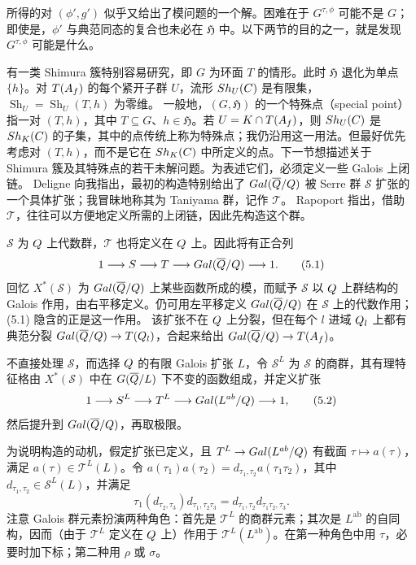 所得的对 $(\phi',g')$ 似乎又给出了模问题的一个解。困难在于 $G^{\tau,\phi}$ 可能不是
$G$；即使是，$\phi'$ 与典范同态的复合也未必在 $\mathfrak H$ 中。以下两节的目的之一，就是发现
$G^{\tau,\phi}$ 可能是什么。

有一类 Shimura 簇特别容易研究，即 $G$ 为环面 $T$ 的情形。此时 $\mathfrak H$ 退化为单点
$\{h\}$。对 $T(A_f)$ 的每个紧开子群 $U$，流形
$Sh_U(C)$ 是有限集，$\operatorname{Sh}_U=\operatorname{Sh}_U(T,h)$ 为零维。
一般地，$(G,\mathfrak H)$ 的一个特殊点（special point）指一对 $(T,h)$，其中
$T\subseteq G$、$h\in\mathfrak H$。若 $U=K\cap T(A_f)$，则
$Sh_U(C)$ 是 $Sh_K(C)$ 的子集，其中的点传统上称为特殊点；我仍沿用这一用法。但最好优先考虑对
$(T,h)$，而不是它在 $Sh_K(C)$ 中所定义的点。下一节想描述关于
Shimura 簇及其特殊点的若干未解问题。为表述它们，必须定义一些 Galois 上闭链。
Deligne 向我指出，最初的构造特别给出了 $Gal(\overline{Q}/Q)$ 被 Serre 群
$\mathcal S$ 扩张的一个具体扩张；我冒昧地称其为 Taniyama 群，记作 $\mathcal T$。
Rapoport 指出，借助 $\mathcal T$，往往可以方便地定义所需的上闭链，因此先构造这个群。

$\mathcal S$ 为 $Q$ 上代数群，$\mathcal T$ 也将定义在 $Q$ 上。因此将有正合列
\begin{equation}
1\longrightarrow S\longrightarrow T
\longrightarrow Gal(\overline{Q}/Q)\longrightarrow1.\tag{5.1}
\end{equation}
回忆 $X^*(\mathcal S)$ 为 $Gal(\overline{Q}/Q)$ 上某些函数所成的模，而赋予
$\mathcal S$ 以 $Q$ 上群结构的 Galois 作用，由右平移定义。仍可用左平移定义
$Gal(\overline{Q}/Q)$ 在 $\mathcal S$ 上的代数作用；(5.1) 隐含的正是这一作用。
该扩张不在 $Q$ 上分裂，但在每个 $l$ 进域 $Q_l$ 上都有典范分裂
$Gal(\overline{Q}/Q)\to T(Q_l)$，合起来给出
$Gal(\overline{Q}/Q)\to T(A_f)$。

不直接处理 $\mathcal S$，而选择 $Q$ 的有限 Galois 扩张 $L$，令
$\mathcal S^L$ 为 $\mathcal S$ 的商群，其有理特征格由
$X^*(\mathcal S)$ 中在 $G(\overline{Q}/L)$ 下不变的函数组成，并定义扩张
\begin{equation}
1\longrightarrow S^L\longrightarrow T^L
\longrightarrow Gal(L^{ab}/Q)\longrightarrow1,\tag{5.2}
\end{equation}
然后提升到 $Gal(\overline{Q}/Q)$，再取极限。

为说明构造的动机，假定扩张已定义，且
$T^L\to Gal(L^{ab}/Q)$ 有截面 $\tau\mapsto a(\tau)$，满足
$a(\tau)\in\mathcal T^L(L)$。令
$a(\tau_1)a(\tau_2)=d_{\tau_1,\tau_2}a(\tau_1\tau_2)$，其中
$d_{\tau_1,\tau_2}\in\mathcal S^L(L)$，并满足
\begin{equation}
\tau_1(d_{\tau_2,\tau_3})d_{\tau_1,\tau_2\tau_3}
=d_{\tau_1,\tau_2}d_{\tau_1\tau_2,\tau_3}.\tag{5.3}
\end{equation}
注意 Galois 群元素扮演两种角色：首先是 $\mathcal T^L$ 的商群元素；其次是
$L^{\mathrm{ab}}$ 的自同构，因而（由于 $\mathcal T^L$ 定义在 $Q$ 上）作用于
$\mathcal T^L(L^{\mathrm{ab}})$。在第一种角色中用 $\tau$，必要时加下标；第二种用
$\rho$ 或 $\sigma$。

